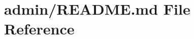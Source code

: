 \hypertarget{admin_2_r_e_a_d_m_e_8md}{\section{admin/\-R\-E\-A\-D\-M\-E.md File Reference}
\label{admin_2_r_e_a_d_m_e_8md}
}
